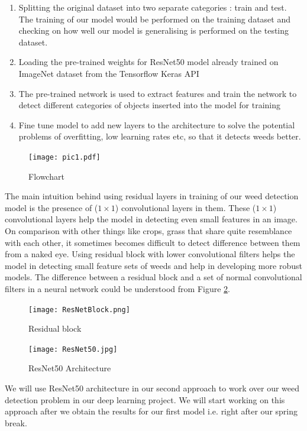 \documentclass{report}
\begin{document}
\begin{enumerate}
	\item Splitting the original dataset into two separate categories : train and test. The training of our model would be performed on the training dataset and checking on how well our model is generalising is performed on the testing dataset. 
	\item Loading the pre-trained weights for ResNet50 model already trained on ImageNet dataset from the Tensorflow Keras API
	\item The pre-trained network is used to extract features and train the network to detect different categories of objects inserted into the model for training 
	\item Fine tune model to add new layers to the architecture to solve the potential problems of overfitting, low learning rates etc, so that it detects weeds better.

\end{enumerate}
\begin{figure}[H]
\centering
\texttt{[image: pic1.pdf]}
\caption{Flowchart}
\label{fig:Flowchart}
\end{figure}

The main intuition behind using residual layers in training of our weed detection model is the presence of ($1 \times 1$) convolutional layers in them. These ($1 \times 1$) convolutional layers help the model in detecting even small features in an image. On comparison with other things like crops, grass that share quite resemblance with each other, it sometimes becomes difficult to detect difference between them from a naked eye. Using residual block with lower convolutional filters helps the model in detecting small feature sets of weeds and help in developing more robust models. The difference between a residual block and a set of normal convolutional filters in a neural network could be understood from Figure \ref{fig:ResidualBlock}. 

\begin{figure}[H]
    \centering
    \texttt{[image: ResNetBlock.png]}
    \caption{Residual block }
    \label{fig:ResidualBlock}
\end{figure}


\begin{figure}[H]
    \centering
    \texttt{[image: ResNet50.jpg]}
    \caption{ResNet50 Architecture}
    \label{fig:ResNet50}
\end{figure}

We will use ResNet50 architecture in our second approach to work over our weed detection problem in our deep learning project. We will start working on this approach after we obtain the results for our first model i.e. right after our spring break.
\end{document}
